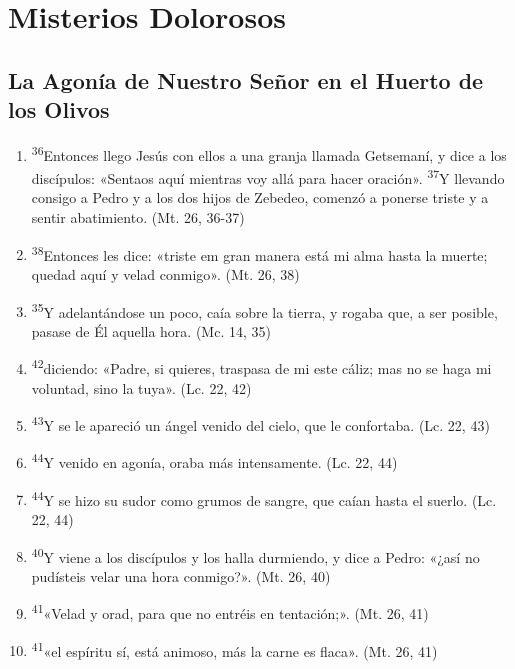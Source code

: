 \documentclass[a4paper,11pt]{article}
\begin{document}
    \newpage
        
  \section*{\hfil Misterios Dolorosos \hfil}
    
    \subsection*{\hfil La Agonía de Nuestro Señor en el Huerto de los Olivos \hfil}
      
      \begin{enumerate}

        \item \textsuperscript{36}Entonces llego Jesús con ellos a una granja llamada Getsemaní, y dice a los discípulos: «Sentaos aquí mientras voy allá para hacer oración». 
        \textsuperscript{37}Y llevando consigo a Pedro y a los dos hijos de Zebedeo, comenzó a ponerse triste y a sentir abatimiento. (Mt. 26, 36-37)

        \item \textsuperscript{38}Entonces les dice: «triste em gran manera está mi alma hasta la muerte; quedad aquí y velad conmigo». (Mt. 26, 38)

        \item \textsuperscript{35}Y adelantándose un poco, caía sobre la tierra, y rogaba que, a ser posible, pasase de Él aquella hora. (Mc. 14, 35)

        \item \textsuperscript{42}diciendo: «Padre, si quieres, traspasa de mi este cáliz; mas no se haga mi voluntad, sino la tuya». (Lc. 22, 42)

        \item \textsuperscript{43}Y se le apareció un ángel venido del cielo, que le confortaba. (Lc. 22, 43)

        \item \textsuperscript{44}Y venido en agonía, oraba más intensamente. (Lc. 22, 44)

        \item \textsuperscript{44}Y se hizo su sudor como grumos de sangre, que caían hasta el suerlo. (Lc. 22, 44)

        \item \textsuperscript{40}Y viene a los discípulos y los halla durmiendo, y dice a Pedro: «¿así no pudísteis velar una hora conmigo?». (Mt. 26, 40)

        \item \textsuperscript{41}«Velad y orad, para que no entréis en tentación;». (Mt. 26, 41)

        \item \textsuperscript{41}«el espíritu sí, está animoso, más la carne es flaca». (Mt. 26, 41)

      \end{enumerate}
\end{document}
